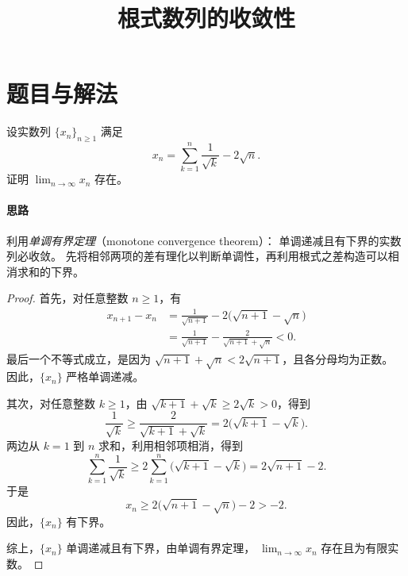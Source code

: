 \documentclass[UTF8,12pt,a4paper,fontset=fandol]{ctexart}
\title{根式数列的收敛性}
\author{}
\date{}
\begin{document}
\maketitle

\section{题目与解法}

\begin{example}
  设实数列 $\{x_n\}_{n\ge1}$ 满足
  \[
    x_n=\sum_{k=1}^{n}\frac{1}{\sqrt{k}}-2\sqrt{n}.
  \]
  证明 $\displaystyle\lim_{n\to\infty}x_n$ 存在。
\end{example}

\paragraph{思路}
利用\emph{单调有界定理}（monotone convergence theorem）：
单调递减且有下界的实数列必收敛。
先将相邻两项的差有理化以判断单调性，再利用根式之差构造可以相消求和的下界。

\begin{proof}
\color{black}
首先，对任意整数 $n\ge1$，有
\begin{align*}
  x_{n+1}-x_n
  &=\frac{1}{\sqrt{n+1}}-2\bigl(\sqrt{n+1}-\sqrt{n}\bigr)\\
  &=\frac{1}{\sqrt{n+1}}-
    \frac{2}{\sqrt{n+1}+\sqrt{n}}<0.
\end{align*}
最后一个不等式成立，是因为
$\sqrt{n+1}+\sqrt{n}<2\sqrt{n+1}$，且各分母均为正数。
因此，$\{x_n\}$ 严格单调递减。

其次，对任意整数 $k\ge1$，由
$\sqrt{k+1}+\sqrt{k}\ge2\sqrt{k}>0$，得到
\[
  \frac{1}{\sqrt{k}}
  \ge\frac{2}{\sqrt{k+1}+\sqrt{k}}
  =2\bigl(\sqrt{k+1}-\sqrt{k}\bigr).
\]
两边从 $k=1$ 到 $n$ 求和，利用相邻项相消，得到
\[
  \sum_{k=1}^{n}\frac{1}{\sqrt{k}}
  \ge2\sum_{k=1}^{n}\bigl(\sqrt{k+1}-\sqrt{k}\bigr)
  =2\sqrt{n+1}-2.
\]
于是
\[
  x_n\ge2\bigl(\sqrt{n+1}-\sqrt{n}\bigr)-2>-2.
\]
因此，$\{x_n\}$ 有下界。

综上，$\{x_n\}$ 单调递减且有下界，由单调有界定理，
$\displaystyle\lim_{n\to\infty}x_n$ 存在且为有限实数。
\end{proof}
\end{document}
